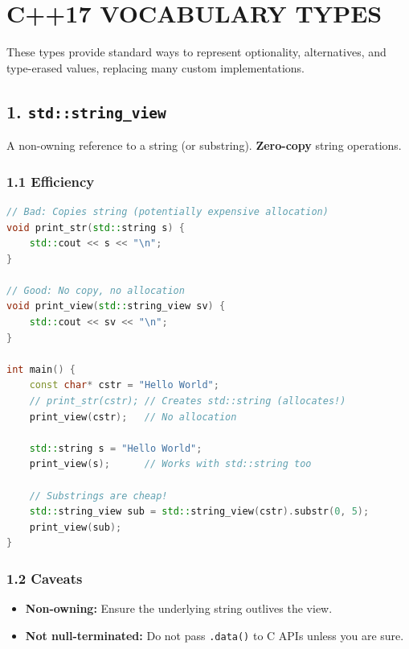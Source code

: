 \hypertarget{c17-vocabulary-types}{%
\chapter{C++17 VOCABULARY TYPES}\label{c17-vocabulary-types}}

These types provide standard ways to represent optionality,
alternatives, and type-erased values, replacing many custom
implementations.

\hypertarget{stdstring_view}{%
\section{\texorpdfstring{1.
\texttt{std::string\_view}}{1. std::string\_view}}\label{stdstring_view}}

A non-owning reference to a string (or substring). \textbf{Zero-copy}
string operations.

\hypertarget{efficiency}{%
\subsection{1.1 Efficiency}\label{efficiency}}

\begin{lstlisting}[language={C++}]
// Bad: Copies string (potentially expensive allocation)
void print_str(std::string s) {
    std::cout << s << "\n";
}

// Good: No copy, no allocation
void print_view(std::string_view sv) {
    std::cout << sv << "\n";
}

int main() {
    const char* cstr = "Hello World";
    // print_str(cstr); // Creates std::string (allocates!)
    print_view(cstr);   // No allocation
    
    std::string s = "Hello World";
    print_view(s);      // Works with std::string too
    
    // Substrings are cheap!
    std::string_view sub = std::string_view(cstr).substr(0, 5); 
    print_view(sub);
}
\end{lstlisting}

\hypertarget{caveats}{%
\subsection{1.2 Caveats}\label{caveats}}

\begin{itemize}
\tightlist
\item
  \textbf{Non-owning:} Ensure the underlying string outlives the view.
\item
  \textbf{Not null-terminated:} Do not pass
  \passthrough{\lstinline!.data()!} to C APIs unless you are sure.
\end{itemize}

